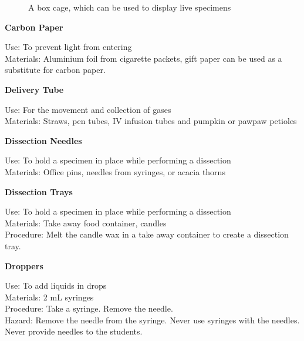 \begin{figure}[h]
\begin{center}
\def\svgwidth{6cm}

\caption{A box cage, which can be used to display live specimens}
\label{fig:box-cage}
\end{center}
\end{figure}

\begin{flushleft}
\textbf{Carbon Paper}
\end{flushleft}
\vspace{-10pt}
Use: To prevent light from entering\\
Materials: Aluminium foil from cigarette packets, gift paper can be used as a substitute for carbon paper. \\

\begin{flushleft}
\textbf{Delivery Tube}
\end{flushleft}
\vspace{-10pt}
Use: For the movement and collection of gases\\
Materials: Straws, pen tubes, IV infusion tubes and pumpkin or pawpaw petioles\\

\begin{flushleft}
\textbf{Dissection Needles}
\end{flushleft}
\vspace{-10pt}
Use: To hold a specimen in place while performing a dissection\\
Materials: Office pins, needles from syringes, or acacia thorns\\

\begin{flushleft}
\textbf{Dissection Trays}
\end{flushleft}
\vspace{-10pt}
Use: To hold a specimen in place while performing a dissection\\
Materials: Take away food container, candles\\
Procedure: Melt the candle wax in a take away container to create a dissection tray.\\

\begin{flushleft}
\textbf{Droppers}
\end{flushleft}
\vspace{-10pt}
Use: To add liquids in drops\\
Materials: 2 mL syringes\\
Procedure: Take a syringe. Remove the needle. \\
Hazard: Remove the needle from the syringe. Never use syringes with the needles. Never provide needles to the students.\\

